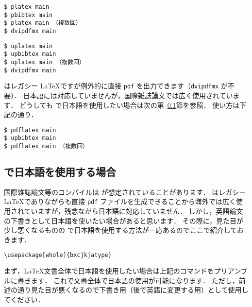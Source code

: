 \begin{tcolorbox}[enhanced, title=\pLaTeX$+$\pBibTeX, drop fuzzy shadow]
\begin{verbatim}
$ platex main
$ pbibtex main
$ platex main （複数回）
$ dvipdfmx main
\end{verbatim}
\end{tcolorbox}


\begin{tcolorbox}[enhanced, title=\upLaTeX$+$\upBibTeX, drop fuzzy shadow]
\begin{verbatim}
$ uplatex main
$ upbibtex main
$ uplatex main （複数回）
$ dvipdfmx main
\end{verbatim}
\end{tcolorbox}


\pLaTeX はレガシー \LaTeX ですが例外的に直接 \verb|pdf| を出力できます（\verb|dvipdfmx| が不要）．
日本語には対応していませんが，国際雑誌論文では広く使用されています．
どうしても \pdfLaTeX で日本語を使用したい場合は次の第~\ref{ssec:pdflatex_jp}節を参照．
使い方は下記の通り．

\begin{tcolorbox}[enhanced, title=\pdfLaTeX$+$\upBibTeX, drop fuzzy shadow]
\begin{verbatim}
$ pdflatex main
$ upbibtex main
$ pdflatex main （複数回）
\end{verbatim}
\end{tcolorbox}


\subsection{\pdfLaTeX で日本語を使用する場合}
\label{ssec:pdflatex_jp}

国際雑誌論文等のコンパイルは \pdfLaTeX が想定されていることがあります．
\pdfLaTeX はレガシー \LaTeX でありながらも直接 \verb|pdf| ファイルを生成できることから海外では広く使用されていますが，残念ながら日本語に対応していません．
しかし，英語論文の下書きとして日本語を使いたい場合があると思います．
その際に，見た目が少し悪くなるものの \pdfLaTeX で日本語を使用する方法が一応あるのでここで紹介しておきます．

\begin{tcolorbox}[enhanced, title=文書全体で日本語を使用, drop fuzzy shadow]
\begin{verbatim}
\usepackage[whole]{bxcjkjatype}
\end{verbatim}
\end{tcolorbox}

まず，\LaTeX 文書全体で日本語を使用したい場合は上記のコマンドをプリアンブルに書きます．
これで文書全体で日本語の使用が可能になります．
ただし，前述の通り見た目が悪くなるので下書き用（後で英語に変更する用）として使用してください．

